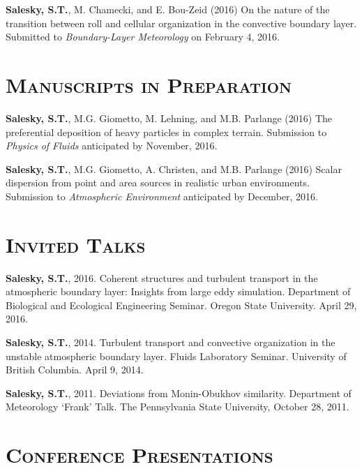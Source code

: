 \documentclass[11pt,letterpaper]{article}
\begin{document}
\textbf{Salesky, S.T.}, M. Chamecki, and E. Bou-Zeid (2016) On the nature of
the transition between roll and cellular organization in the convective
boundary layer. Submitted to \textit{Boundary-Layer Meteorology} on February 4, 2016.

\section*{\textsc{Manuscripts in Preparation}} 

\textbf{Salesky, S.T.}, M.G. Giometto, M. Lehning, and M.B. Parlange (2016)
The preferential deposition of heavy particles in complex terrain. Submission 
to \textit{Physics of Fluids} anticipated by November, 2016.

\textbf{Salesky, S.T.}, M.G. Giometto, A. Christen, and M.B. Parlange (2016)
Scalar dispersion from point and area sources in realistic urban environments.
Submission to \textit{Atmospheric Environment} anticipated by December, 2016.

\section*{\textsc{Invited Talks}} 

\textbf{Salesky, S.T.}, 2016. Coherent structures and turbulent transport in the atmospheric boundary layer: Insights 
from large eddy simulation. Department of Biological and Ecological Engineering Seminar. Oregon State University. 
April 29, 2016.

\textbf{Salesky, S.T.}, 2014. Turbulent transport and convective organization in the unstable atmospheric boundary layer. Fluids Laboratory Seminar. University of British Columbia. April 9, 2014. 

\textbf{Salesky, S.T.}, 2011. Deviations from Monin-Obukhov similarity. Department of Meteorology `Frank' Talk. The Pennsylvania State University, October 28, 2011. 

\section*{\textsc{Conference Presentations}} 
\end{document}
